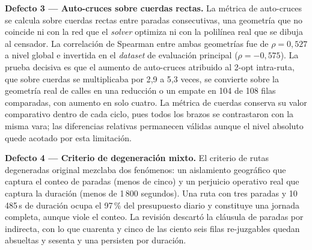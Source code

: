 \textbf{Defecto 3 --- Auto-cruces sobre cuerdas rectas.}
La métrica de auto-cruces se calcula sobre cuerdas rectas entre paradas consecutivas, una
geometría que no coincide ni con la red que el \textit{solver} optimiza ni con la
polilínea real que se dibuja al censador. La correlación de Spearman entre ambas
geometrías fue de $\rho = 0{,}527$ a nivel global e invertida en el \textit{dataset} de
evaluación principal ($\rho = -0{,}575$). La prueba decisiva es que el aumento de
auto-cruces atribuido al 2-opt intra-ruta, que sobre cuerdas se multiplicaba por 2{,}9 a
5{,}3 veces, se convierte sobre la geometría real de calles en una reducción o un empate
en 104 de 108 filas comparadas, con aumento en solo cuatro. La métrica de cuerdas conserva
su valor comparativo dentro de cada ciclo, pues todos los brazos se contrastaron con la
misma vara; las diferencias relativas permanecen válidas aunque el nivel absoluto quede
acotado por esta limitación.

\textbf{Defecto 4 --- Criterio de degeneración mixto.}
El criterio de rutas degeneradas original mezclaba dos fenómenos: un aislamiento
geográfico que captura el conteo de paradas (menos de cinco) y un perjuicio operativo real
que captura la duración (menos de 1\,800 segundos). Una ruta con tres paradas y
10\,485\,s de duración ocupa el 97\,\% del presupuesto diario y constituye una jornada
completa, aunque viole el conteo. La revisión descartó la cláusula de paradas por
indirecta, con lo que cuarenta y cinco de las ciento seis filas re-juzgables quedan
absueltas y sesenta y una persisten por duración.
